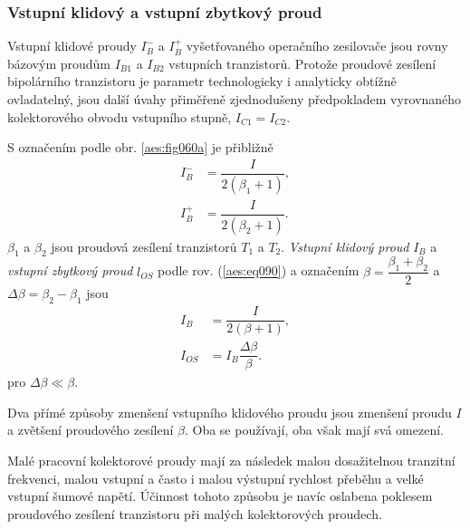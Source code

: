       \subsubsection{Vstupní klidový a vstupní zbytkový proud}\label{aesIchIIIsecIIIssecIX}
        Vstupní klidové proudy \(I_B^-\) a \(I_B^+\) vyšetřovaného operačního zesilovače jsou rovny
        bázovým proudům \(I_{B1}\) a \(I_{B2}\) vstupních tranzistorů. Protože proudové zesílení
        bipolárního tranzistoru je parametr technologicky i analyticky obtížně ovladatelný, jsou
        další úvahy přiměřeně zjednodušeny předpokladem vyrovnaného kolektorového obvodu vstupního
        stupně, \(I_{C1} = I_{C2}\).

        S označením podle obr. \ref{aes:fig060a} je přibližně
        \begin{subequations}\label{aes:eq065}
          \begin{align}
            I_B^- &= \dfrac{I}{2(\beta_1 + 1)},                    \label{aes:eq065a}  \\
            I_B^+ &= \dfrac{I}{2(\beta_2 + 1)}.                    \label{aes:eq065b} 
          \end{align}
        \end{subequations}
        \(\beta_1\) a \(\beta_2\) jsou proudová zesílení tranzistorů \(T_1\) a \(T_2\).
        \emph{Vstupní klidový proud} \(I_B\) a \emph{vstupní zbytkový proud} \(l_{OS}\) podle rov.
        (\ref{aes:eq090}) a označením \(\beta = \dfrac{\beta_1 + \beta_2}{2}\) a \(\Delta\beta =
        \beta_2 - \beta_1\) jsou
        \begin{subequations}\label{aes:eq066}
          \begin{align}
            I_B    &= \dfrac{I}{2(\beta + 1)},                    \label{aes:eq066a}  \\
            I_{OS} &= I_B\dfrac{\Delta\beta}{\beta}.              \label{aes:eq066b} 
          \end{align}
        \end{subequations}
        pro \(\Delta\beta\ll\beta\).

        Dva přímé způsoby zmenšení vstupního klidového proudu jsou zmenšení proudu \(I\) a zvětšení
        proudového zesílení \(\beta\). Oba se používají, oba však mají svá omezení.

        Malé pracovní kolektorové proudy mají za následek malou dosažitelnou tranzitní frekvenci,
        malou vstupní a často i malou výstupní rychlost přeběhu a velké vstupní šumové napětí.
        Účinnost tohoto způsobu je navíc oslabena poklesem proudového zesílení tranzistoru při
        malých kolektorových proudech.

